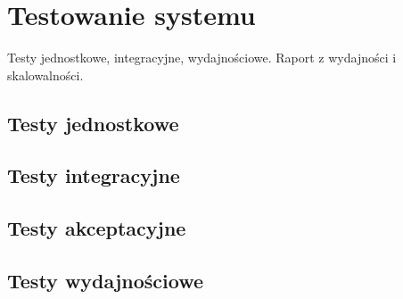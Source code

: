 \clearpage %

\section{Testowanie systemu}

Testy jednostkowe, integracyjne, wydajnościowe. Raport z wydajności i skalowalności.

\subsection{Testy jednostkowe}

\subsection{Testy integracyjne}

\subsection{Testy akceptacyjne}

\subsection{Testy wydajnościowe}